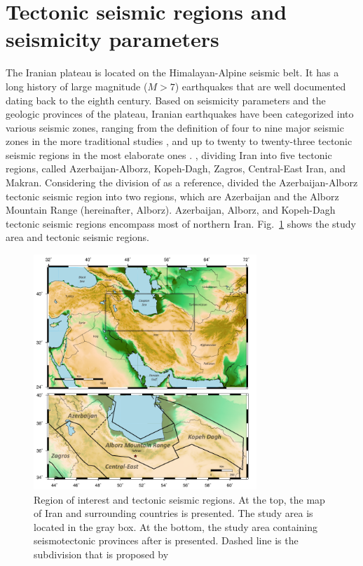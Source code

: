
\section{Tectonic seismic regions and seismicity parameters}

The Iranian plateau is located on the Himalayan-Alpine seismic belt. It has a long history of large magnitude ($M>7$) earthquakes that are well documented dating back to the eighth century. Based on seismicity parameters and the geologic provinces of the plateau, Iranian earthquakes have been categorized into various seismic zones, ranging from the definition of four to nine major seismic zones in the more traditional studies \citep[e.g.,][]{Stocklin1968,Takin1972,Berberian1976}, and up to twenty to twenty-three tectonic seismic regions in the most elaborate ones \citep[e.g.,][]{Nowroozi1976,Tavakoli1999}. \citet{Mirzaei1998},  dividing Iran into five tectonic regions, called Azerbaijan-Alborz, Kopeh-Dagh, Zagros, Central-East Iran, and Makran. Considering the division of  \citet{Mirzaei1998} as a reference,  \citet{Karimiparidari2013}  divided the Azerbaijan-Alborz tectonic seismic region into two regions, which are Azerbaijan and the Alborz Mountain Range (hereinafter, Alborz). Azerbaijan, Alborz, and Kopeh-Dagh tectonic seismic regions encompass most of northern Iran.  Fig.~\ref{fig:study_region} shows the study area and tectonic seismic regions.
 
\begin{figure}[t]
	\centering
	\includegraphics[width=0.75\textwidth]{figures/pdf/Figure02} 
	\caption{Region of interest and tectonic seismic regions. At the top, the map of Iran and surrounding countries is presented. The study area is located in the gray box. At the bottom, the study area containing seismotectonic provinces after \citet{Mirzaei1998} is presented. Dashed line is the subdivision that is proposed by \citet{Karimiparidari2013}}
	\label{fig:study_region}
\end{figure}
  
